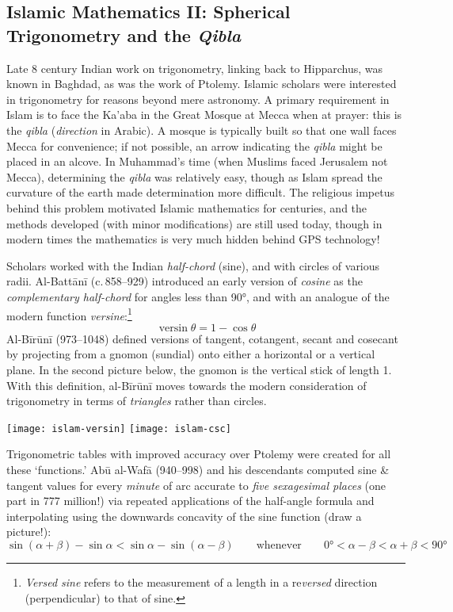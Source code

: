 \clearpage



\subsection{Islamic Mathematics II: Spherical Trigonometry and the \emph{Qibla}}

Late 8\th{} century Indian work on trigonometry, linking back to Hipparchus, was known in Baghdad, as was the work of Ptolemy. Islamic scholars were interested in trigonometry for reasons beyond mere astronomy. A primary requirement in Islam is to face the Ka'aba in the Great Mosque at Mecca when at prayer: this is the \emph{qibla} (\emph{direction} in Arabic). A mosque is typically built so that one wall faces Mecca for convenience; if not possible, an arrow indicating the \emph{qibla} might be placed in an alcove. In Muhammad's time (when Muslims faced Jerusalem not Mecca), determining the \emph{qibla} was relatively easy, though as Islam spread the curvature of the earth made determination more difficult. The religious impetus behind this problem motivated Islamic mathematics for centuries, and the methods developed (with minor modifications) are still used today, though in modern times the mathematics is very much hidden behind GPS technology!



Scholars worked with the Indian \emph{half-chord} (sine), and with circles of various radii. Al-Battānī (c.\,858--929) introduced an early version of \emph{cosine} as the \emph{complementary half-chord} for angles less than \ang{90}, and with an analogue of the modern function \emph{versine}:\footnote{\emph{Versed sine} refers to the measurement of a length in a re\emph{versed} direction (perpendicular) to that of sine.}
\[
	\operatorname{versin}\theta=1-\cos\theta
\]
Al-Bīrūnī (973--1048) defined versions of tangent, cotangent, secant and cosecant by projecting from a gnomon (sundial) onto either a horizontal or a vertical plane. In the second picture below, the gnomon is the vertical stick of length 1. With this definition, al-Bīrūnī moves towards the modern consideration of trigonometry in terms of \emph{triangles} rather than circles.
\begin{center}
  \texttt{[image: islam-versin]}\qquad\qquad
  \texttt{[image: islam-csc]}
\end{center}\label{pg:sineconcave}

Trigonometric tables with improved accuracy over Ptolemy were created for all these `functions.' Abū al-Wafā (940--998) and his descendants computed sine \& tangent values for every \emph{minute} of arc accurate to \emph{five sexagesimal places} (one part in 777 million!) via repeated applications of the half-angle formula and interpolating using the downwards concavity of the sine function (draw a picture!):
\[
	\sin(\alpha+\beta)-\sin\alpha<\sin\alpha-\sin(\alpha-\beta)
	\qquad\text{whenever}\qquad
	\ang{0}<\alpha-\beta<\alpha+\beta<\ang{90}
\]

